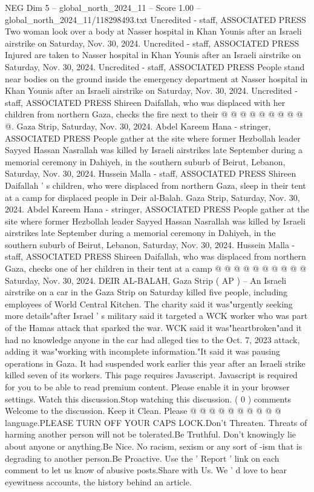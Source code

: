 \begin{textsample}{NEG Dim 5 – global\_north\_2024\_11 – Score 1.00 – global\_north\_2024\_11/118298493.txt}
Uncredited - staff, ASSOCIATED PRESS Two woman look over a body at Nasser hospital in Khan Younis after an Israeli airstrike on Saturday, Nov. 30, 2024.
Uncredited - staff, ASSOCIATED PRESS Injured are taken to Nasser hospital in Khan Younis after an Israeli airstrike on Saturday, Nov. 30, 2024.
Uncredited - staff, ASSOCIATED PRESS People stand near bodies on the ground inside the emergency department at Nasser hospital in Khan Younis after an Israeli airstrike on Saturday, Nov. 30, 2024.
Uncredited - staff, ASSOCIATED PRESS Shireen Daifallah, who was displaced with her children from northern Gaza, checks the fire next to their @ @ @ @ @ @ @ @ @ @.
Gaza Strip, Saturday, Nov. 30, 2024.
Abdel Kareem Hana - stringer, ASSOCIATED PRESS People gather at the site where former Hezbollah leader Sayyed Hassan Nasrallah was killed by Israeli airstrikes late September during a memorial ceremony in Dahiyeh, in the southern suburb of Beirut, Lebanon, Saturday, Nov. 30, 2024.
Hussein Malla - staff, ASSOCIATED PRESS Shireen Daifallah ' s children, who were displaced from northern Gaza, sleep in their tent at a camp for displaced people in Deir al-Balah.
Gaza Strip, Saturday, Nov. 30, 2024.
Abdel Kareem Hana - stringer, ASSOCIATED PRESS People gather at the site where former Hezbollah leader Sayyed Hassan Nasrallah was killed by Israeli airstrikes late September during a memorial ceremony in Dahiyeh, in the southern suburb of Beirut, Lebanon, Saturday, Nov. 30, 2024.
Hussein Malla - staff, ASSOCIATED PRESS Shireen Daifallah, who was displaced from northern Gaza, checks one of her children in their tent at a camp @ @ @ @ @ @ @ @ @ @ Saturday, Nov. 30, 2024.
DEIR AL-BALAH, Gaza Strip ( AP ) -- An Israeli airstrike on a car in the Gaza Strip on Saturday killed five people, including employees of World Central Kitchen.
The charity said it was"urgently seeking more details"after Israel ' s military said it targeted a WCK worker who was part of the Hamas attack that sparked the war.
WCK said it was"heartbroken"and it had no knowledge anyone in the car had alleged ties to the Oct. 7, 2023 attack, adding it was"working with incomplete information."It said it was pausing operations in Gaza.
It had suspended work earlier this year after an Israeli strike killed seven of its workers.
This page requires Javascript.
Javascript is required for you to be able to read premium content.
Please enable it in your browser settings.
Watch this discussion.Stop watching this discussion. ( 0 ) comments Welcome to the discussion.
Keep it Clean.
Please @ @ @ @ @ @ @ @ @ @ language.PLEASE TURN OFF YOUR CAPS LOCK.Don't Threaten.
Threats of harming another person will not be tolerated.Be Truthful.
Don't knowingly lie about anyone or anything.Be Nice.
No racism, sexism or any sort of -ism that is degrading to another person.Be Proactive.
Use the ' Report ' link on each comment to let us know of abusive posts.Share with Us.
We ' d love to hear eyewitness accounts, the history behind an article.

\end{textsample}
